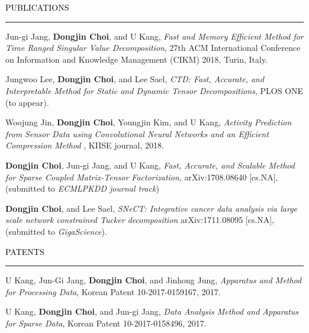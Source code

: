 \documentclass{resume} %
\renewenvironment{rSection}[1]{
	\sectionskip
	\textcolor{Black}{\MakeUppercase{#1}}
	\sectionlineskip
	\hrule
	\begin{list}{}{
			\setlength{\leftmargin}{1.5em}
		}
		\item[]
	}{
	\end{list}
}
\begin{document}
\begin{rSection}{Publications}
\begin{rSubsection}{}{}{}{}
	\vspace*{-2.5mm}
	\item Jun-gi Jang, \textbf{Dongjin Choi}, and U Kang, \textit{Fast and Memory Efficient Method for Time Ranged Singular Value Decomposition}, 27th ACM International Conference on Information and Knowledge Management (CIKM) 2018, Turin, Italy.
	
	\item Jungwoo Lee, \textbf{Dongjin Choi}, and Lee Sael, \textit{CTD: Fast, Accurate, and Interpretable Method for Static and Dynamic Tensor Decompositions}, PLOS ONE (to appear).
	
	\item Woojung Jin, \textbf{Dongjin Choi}, Youngjin Kim, and U Kang, \textit{Activity Prediction from Sensor Data using Convolutional Neural Networks and an Efficient Compression Method }, KIISE journal, 2018.
	
	\item \textbf{Dongjin Choi}, Jun-gi Jang, and U Kang, \textit{Fast, Accurate, and Scalable Method for Sparse Coupled Matrix-Tensor Factorization}, arXiv:1708.08640 [cs.NA], (submitted to \textit{ECMLPKDD journal track})
	
	\item \textbf{Dongjin Choi}, and Lee Sael, \textit{SNeCT: Integrative cancer data analysis via large scale network constrained Tucker decomposition} arXiv:1711.08095 [cs.NA], (submitted to \textit{GigaScience}).
	
\end{rSubsection}

\end{rSection}
\vspace{-3mm}



\begin{rSection}{Patents}
	\begin{rSubsection}{}{}{}{}
		\vspace*{-2.5mm}
		\item U Kang, Jun-Gi Jang, \textbf{Dongjin Choi}, and Jinhong Jung, \textit{Apparatus and Method for Processing Data}, Korean Patent 10-2017-0159167, 2017.
		\item U Kang, \textbf{Dongjin Choi}, and Jun-gi Jang, \textit{Data Analysis Method and Apparatus for Sparse Data}, Korean Patent 10-2017-0158496, 2017.
	\end{rSubsection}
	
\end{rSection}
\vspace{-3mm}
\end{document}

